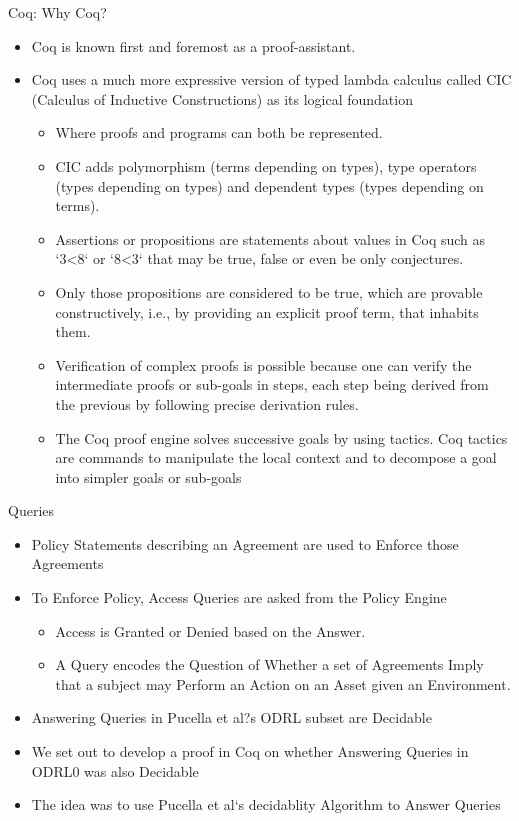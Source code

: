 \documentclass{beamer}
\begin{document}
\begin{frame}[fragile]{Coq: Why Coq?}
\small
\begin{itemize}
\item Coq is known first and foremost as a proof-assistant.
\item Coq uses a much more expressive version of typed lambda calculus called CIC (Calculus of Inductive Constructions) as its logical foundation
    \begin{itemize}
       \item Where proofs and programs can both be represented.
       \item CIC adds polymorphism (terms depending on types), type operators (types depending on types) and dependent types (types depending on terms).
       \item Assertions or propositions are statements about values in Coq such as `3<8` or `8<3` that may be true, false or even be only conjectures. 
       \item Only those propositions are considered to be true, which are provable constructively, i.e., by providing an explicit proof term, that inhabits them.
       \item Verification of complex proofs is possible because one can verify the intermediate proofs or sub-goals in steps, each step being derived from the previous by following precise derivation rules. 
       \item The Coq proof engine solves successive goals by using tactics. Coq tactics are commands to manipulate the local context and to decompose a goal into simpler goals or sub-goals
   \end{itemize}
\end{itemize}
\end{frame}
\begin{frame}[fragile]{Queries}
\begin{itemize}
\item Policy Statements describing an Agreement are used to Enforce those Agreements 
\item To Enforce Policy, Access Queries are asked from the Policy Engine
    \begin{itemize}
       \item Access is Granted or Denied based on the Answer.
       \item A Query encodes the Question of Whether a set of Agreements Imply that a subject may Perform an Action on an Asset given an Environment.
     \end{itemize}
\item Answering Queries in Pucella et al?s ODRL subset are Decidable
\item We set out to develop a proof in Coq on whether Answering Queries in ODRL0 was also Decidable
\item The idea was to use Pucella et al`s decidablity Algorithm to Answer Queries
\end{itemize}
\end{frame}
\end{document}
